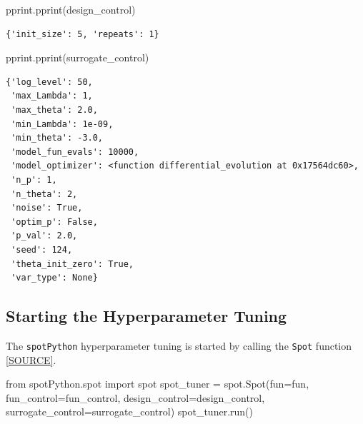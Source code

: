 \documentclass[
  letterpaper,
  DIV=11,
  numbers=noendperiod]{scrreprt}
\newenvironment{Shaded}{\begin{snugshade}}{\end{snugshade}}
\newcommand{\ImportTok}[1]{\textcolor[rgb]{0.00,0.46,0.62}{#1}}
\newcommand{\NormalTok}[1]{\textcolor[rgb]{0.00,0.23,0.31}{#1}}
\newcommand{\OperatorTok}[1]{\textcolor[rgb]{0.37,0.37,0.37}{#1}}
\begin{document}
\begin{Shaded}
\begin{Highlighting}[]
\NormalTok{pprint.pprint(design\_control)}
\end{Highlighting}
\end{Shaded}

\begin{verbatim}
{'init_size': 5, 'repeats': 1}
\end{verbatim}

\begin{Shaded}
\begin{Highlighting}[]
\NormalTok{pprint.pprint(surrogate\_control)}
\end{Highlighting}
\end{Shaded}

\begin{verbatim}
{'log_level': 50,
 'max_Lambda': 1,
 'max_theta': 2.0,
 'min_Lambda': 1e-09,
 'min_theta': -3.0,
 'model_fun_evals': 10000,
 'model_optimizer': <function differential_evolution at 0x17564dc60>,
 'n_p': 1,
 'n_theta': 2,
 'noise': True,
 'optim_p': False,
 'p_val': 2.0,
 'seed': 124,
 'theta_init_zero': True,
 'var_type': None}
\end{verbatim}

\subsection{Starting the Hyperparameter
Tuning}\label{sec-call-the-hyperparameter-tuner-32}

The \texttt{spotPython} hyperparameter tuning is started by calling the
\texttt{Spot} function
\href{https://github.com/sequential-parameter-optimization/spotPython/blob/main/src/spotPython/spot/spot.py}{{[}SOURCE{]}}.

\begin{Shaded}
\begin{Highlighting}[]
\ImportTok{from}\NormalTok{ spotPython.spot }\ImportTok{import}\NormalTok{ spot}
\NormalTok{spot\_tuner }\OperatorTok{=}\NormalTok{ spot.Spot(fun}\OperatorTok{=}\NormalTok{fun,}
\NormalTok{                       fun\_control}\OperatorTok{=}\NormalTok{fun\_control,}
\NormalTok{                       design\_control}\OperatorTok{=}\NormalTok{design\_control,}
\NormalTok{                       surrogate\_control}\OperatorTok{=}\NormalTok{surrogate\_control)}
\NormalTok{spot\_tuner.run()}
\end{Highlighting}
\end{Shaded}
\end{document}
